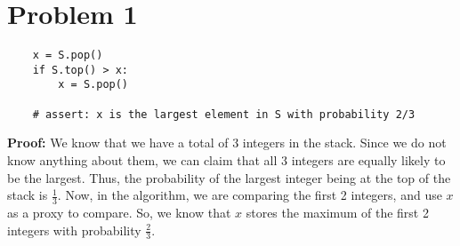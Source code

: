 \documentclass{cs1204}
\author{Rushil Gupta}
\begin{document}
\section*{Problem 1}
\begin{verbatim}
    x = S.pop()
    if S.top() > x:
        x = S.pop()
    
    # assert: x is the largest element in S with probability 2/3
\end{verbatim}

\textbf{Proof:} We know that we have a total of 3 integers in the stack. Since we do not know anything about them, we can claim that all 3 integers are equally likely to be the largest. Thus, the probability of the largest integer being at the top of the stack is $\frac{1}{3}$. Now, in the algorithm, we are comparing the first 2 integers, and use $x$ as a proxy to compare. So, we know that $x$ stores the maximum of the first 2 integers with probability $\frac{2}{3}$.
\end{document}
